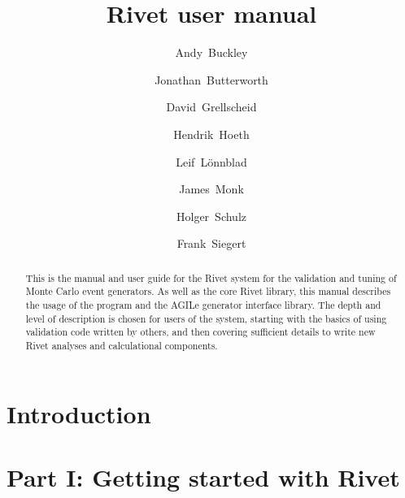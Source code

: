 \documentclass[epjc3]{svjour3}       %
\def\part#1{\section*{\large #1}}
\begin{document}
  
  \title{Rivet user manual}

  \author{Andy~Buckley
    \and
    Jonathan~Butterworth
    \and
    David~Grellscheid
    \and
    Hendrik~Hoeth
    \and
    Leif~L\"onnblad
    \and
    James~Monk
    \and
    Holger~Schulz
    \and
    Frank~Siegert}





\maketitle

  \begin{abstract}
    This is the manual and user guide for the Rivet system for the
    validation and tuning of Monte Carlo event generators. As well as the core
    Rivet library, this manual describes the usage of the  program and
    the AGILe generator interface library. The depth and level of description is
    chosen for users of the system, starting with the basics of using validation
    code written by others, and then covering sufficient details to write new
    Rivet analyses and calculational components.
  \end{abstract}

\section{Introduction}
\label{sec:intro}


\cleardoublepage

\part{Part I: Getting started with Rivet}
\label{part:gettingstarted}

\end{document}
